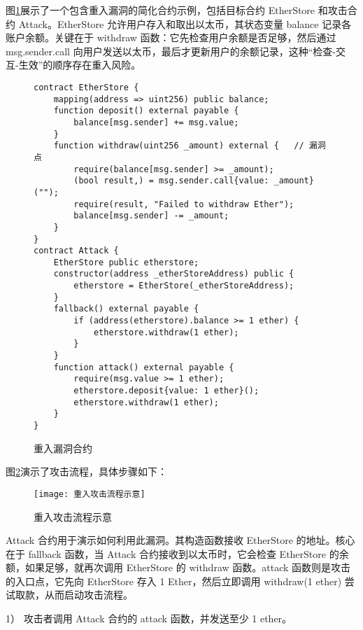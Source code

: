\documentclass[print, master, vlined, timesmath]{DissertUESTC}
\begin{document}
图\ref{fig:重入漏洞合约}展示了一个包含重入漏洞的简化合约示例，包括目标合约 EtherStore 和攻击合约 Attack。EtherStore 允许用户存入和取出以太币，其状态变量 balance 记录各账户余额。关键在于 withdraw 函数：它先检查用户余额是否足够，然后通过 msg.sender.call 向用户发送以太币，最后才更新用户的余额记录，这种“检查-交互-生效”的顺序存在重入风险。
\begin{figure}[h]
    \raggedbottom
    \centering
    \begin{minipage}{0.9\textwidth}
    \begin{verbatim}
contract EtherStore {
    mapping(address => uint256) public balance;
    function deposit() external payable {
        balance[msg.sender] += msg.value;
    }
    function withdraw(uint256 _amount) external {   // 漏洞点
        require(balance[msg.sender] >= _amount);
        (bool result,) = msg.sender.call{value: _amount}("");
        require(result, "Failed to withdraw Ether");
        balance[msg.sender] -= _amount;
    }
}
contract Attack {
    EtherStore public etherstore;
    constructor(address _etherStoreAddress) public {
        etherstore = EtherStore(_etherStoreAddress);
    }
    fallback() external payable {
        if (address(etherstore).balance >= 1 ether) {
            etherstore.withdraw(1 ether);
        }
    }
    function attack() external payable {
        require(msg.value >= 1 ether);
        etherstore.deposit{value: 1 ether}();
        etherstore.withdraw(1 ether);
    }
}
\end{verbatim}
\end{minipage}
\caption{重入漏洞合约}
\label{fig:重入漏洞合约}
\end{figure}


图\ref{fig:重入攻击流程示意}演示了攻击流程，具体步骤如下：
\begin{figure}[h]
    \centering
    \texttt{[image: 重入攻击流程示意]}
    \caption{重入攻击流程示意}
    \label{fig:重入攻击流程示意}
\end{figure}

Attack 合约用于演示如何利用此漏洞。其构造函数接收 EtherStore 的地址。核心在于 fallback 函数，当 Attack 合约接收到以太币时，它会检查 EtherStore 的余额，如果足够，就再次调用 EtherStore 的 withdraw 函数。attack 函数则是攻击的入口点，它先向 EtherStore 存入 1 Ether，然后立即调用 withdraw(1 ether) 尝试取款，从而启动攻击流程。


1） 攻击者调用 Attack 合约的 attack 函数，并发送至少 1 ether。
\end{document}
